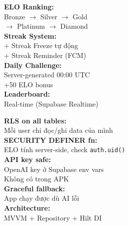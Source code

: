 \documentclass[11pt,a4paper]{article}
\begin{document}
\begin{tcbraster}[raster columns=4, raster column skip=4pt, raster row skip=4pt,
  raster equal height=rows]
\begin{tcolorbox}[enhanced, arc=3pt, colback=vflightgreen, colframe=vfgreen,
  fonttitle=\footnotesize\bfseries, coltitle=white,
  title={Gamification},
  attach boxed title to top left={yshift=-2mm, xshift=3mm},
  boxed title style={colback=vfgreen, arc=2pt},
  left=5pt, right=5pt, top=7pt, bottom=4pt]
{\scriptsize
\textcolor{vfgreen}{\textbf{ELO Ranking:}}\\
Bronze $\to$ Silver $\to$ Gold\\
$\to$ Platinum $\to$ Diamond\\[3pt]
\textcolor{vfgreen}{\textbf{Streak System:}}\\
+ Streak Freeze tự động\\
+ Streak Reminder (FCM)\\[3pt]
\textcolor{vfgreen}{\textbf{Daily Challenge:}}\\
Server-generated 00:00 UTC\\
+50 ELO bonus\\[3pt]
\textcolor{vfgreen}{\textbf{Leaderboard:}}\\
Real-time (Supabase Realtime)}
\end{tcolorbox}

\begin{tcolorbox}[enhanced, arc=3pt, colback=vflightblue, colframe=vfblue,
  fonttitle=\footnotesize\bfseries, coltitle=white,
  title={Security \& Quality},
  attach boxed title to top left={yshift=-2mm, xshift=3mm},
  boxed title style={colback=vfblue, arc=2pt},
  left=5pt, right=5pt, top=7pt, bottom=4pt]
{\scriptsize
\textcolor{vfblue}{\textbf{RLS on all tables:}}\\
Mỗi user chỉ đọc/ghi data của mình\\[3pt]
\textcolor{vfblue}{\textbf{SECURITY DEFINER fn:}}\\
ELO tính server-side, check \texttt{auth.uid()}\\[3pt]
\textcolor{vfblue}{\textbf{API key safe:}}\\
OpenAI key ở Supabase env vars\\
Không có trong APK\\[3pt]
\textcolor{vfblue}{\textbf{Graceful fallback:}}\\
App chạy được dù AI lỗi\\[3pt]
\textcolor{vfblue}{\textbf{Architecture:}}\\
MVVM + Repository + Hilt DI}
\end{tcolorbox}

\end{tcbraster}
\end{document}
